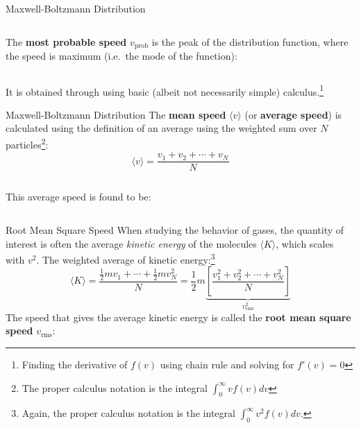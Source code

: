 \documentclass[12pt,aspectratio=169]{beamer}
\begin{document}
\begin{frame}{Maxwell-Boltzmann Distribution}
  \vspace{.15in}\begin{columns}
    
    The \textbf{most probable speed} $v_\text{prob}$ is the peak of the
    distribution function, where the speed is maximum (i.e.\ the mode of the
    function):

  \end{columns}
  \vspace{.2in}It is obtained through using basic (albeit not necessarily
  simple) calculus.\footnote{Finding the derivative of $f(v)$ using chain rule
    and solving for $f'(v)=0$}
  \vspace{.3in}
\end{frame}



\begin{frame}{Maxwell-Boltzmann Distribution}
  The \textbf{mean speed} $\langle v \rangle$ (or \textbf{average speed}) is
  calculated using the definition of an average using the weighted sum over $N$
  particles\footnote{The proper calculus notation is the integral
    $\int_0^\infty vf(v)dv$}:
  \begin{displaymath}
    \langle v\rangle =\frac{v_1+v_2+\cdots+v_N}N
  \end{displaymath}
  \begin{columns}
    
    This average speed is found to be:

  \end{columns}
  \vspace{.15in}
\end{frame}



\begin{frame}{Root Mean Square Speed}
  When studying the behavior of gases, the quantity of interest is often the
  average \emph{kinetic energy} of the molecules $\langle K\rangle$, which
  scales with $v^2$. The weighted average of kinetic energy:\footnote{Again,
    the proper calculus notation is the integral $\int_0^\infty v^2f(v)dv$.}
  \begin{displaymath}
    \langle K\rangle=\frac{\frac12mv_1+\cdots+\frac12mv_N^2}{N}
    =\frac12m
    \underbrace{\left[\frac{v_1^2+v_2^2+\cdots+v_N^2}N\right]}_{v_\text{rms}^2}
  \end{displaymath}
  The speed that gives the average kinetic energy is called the \textbf{root
    mean square speed} $v_\text{rms}$:

  \vspace{.2in}
\end{frame}
\end{document}
